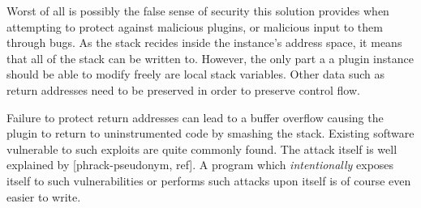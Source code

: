 Worst of all is possibly the false sense of security this solution provides when
attempting to protect against malicious plugins, or malicious input to them
through bugs. As the stack recides inside the instance's address space, it means
that all of the stack can be written to. However, the only part a a plugin
instance should be able to modify freely are local stack variables. Other data
such as return addresses need to be preserved in order to preserve control flow.

Failure to protect return addresses can lead to a buffer overflow causing the
plugin to return to uninstrumented code by smashing the stack. Existing software
vulnerable to such exploits are quite commonly found. The attack itself is well
explained by  [phrack-pseudonym, ref]. A program which \emph{intentionally}
exposes itself to such vulnerabilities or performs such attacks upon itself is
of course even easier to write.
